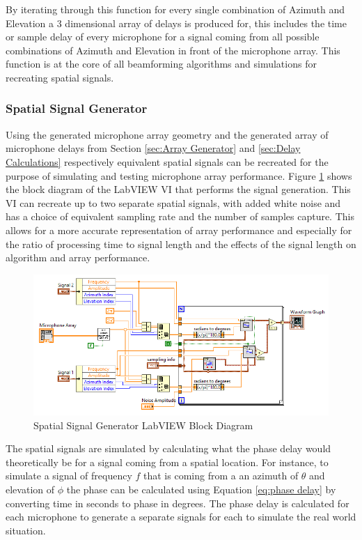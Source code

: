 \documentclass{UoNMCHA}
\numberwithin{equation}{section}
\begin{document}
    By iterating through this function for every single combination of Azimuth and Elevation a 3 dimensional array of delays is produced for, this includes the time or sample delay of every microphone for a signal coming from all possible combinations of Azimuth and Elevation in front of the microphone array. This function is at the core of all beamforming algorithms and simulations for recreating spatial signals.
    
\subsubsection{Spatial Signal Generator} \label{sec:Signal Generator}
    Using the generated microphone array geometry and the generated array of microphone delays from Section \ref{sec:Array Generator} and \ref{sec:Delay Calculations} respectively equivalent spatial signals can be recreated for the purpose of simulating and testing microphone array performance. Figure \ref{fig:SignalGenBlock} shows the block diagram of the LabVIEW VI that performs the signal generation. This VI can recreate up to two separate spatial signals, with added white noise and has a choice of equivalent sampling rate and the number of samples capture. This allows for a more accurate representation of array performance and especially for the ratio of processing time to signal length and the effects of the signal length on algorithm and array performance. 
    
    \begin{figure}[H]
        \centering
        \includegraphics[keepaspectratio, width = \textwidth]{Figures/SignalGenBlock.png}
        \caption{Spatial Signal Generator LabVIEW Block Diagram}
        \label{fig:SignalGenBlock}
    \end{figure}    
    
    The spatial signals are simulated by calculating what the phase delay would theoretically be for a signal coming from a spatial location. For instance, to simulate a signal of frequency $f$ that is coming from a an azimuth of $\theta$ and elevation of $\phi$ the phase can be calculated using Equation \ref{eq:phase delay} by converting time in seconds to phase in degrees. The phase delay is calculated for each microphone to generate a separate signals for each to simulate the real world situation.
    
\end{document}
